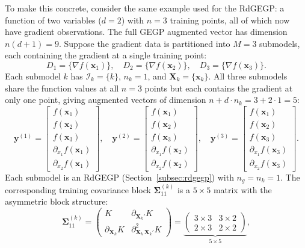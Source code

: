 \documentclass[12pt]{article}
\begin{document}
To make this concrete, consider the same example used for the RdGEGP: a function of two variables ($d = 2$) with $n = 3$ training points, all of which now have gradient observations. The full GEGP augmented vector has dimension $n(d+1) = 9$. Suppose the gradient data is partitioned into $M = 3$ submodels, each containing the gradient at a single training point:
\begin{equation}
	D_1 = \{\nabla f(\mathbf{x}_1)\}, \quad D_2 = \{\nabla f(\mathbf{x}_2)\}, \quad D_3 = \{\nabla f(\mathbf{x}_3)\}.
\end{equation}
Each submodel $k$ has $\mathcal{I}_k = \{k\}$, $n_k = 1$, and $\mathbf{X}_k = \{\mathbf{x}_k\}$. All three submodels share the function values at all $n = 3$ points but each contains the gradient at only one point, giving augmented vectors of dimension $n + d \cdot n_k = 3 + 2 \cdot 1 = 5$:
\begin{equation}
	\label{eqn:wgegp_aug_vectors_2d}
	\mathbf{y}^{(1)} = \begin{bmatrix} f(\mathbf{x}_1) \\ f(\mathbf{x}_2) \\ f(\mathbf{x}_3) \\ \partial_{x_1} f(\mathbf{x}_1) \\ \partial_{x_2} f(\mathbf{x}_1) \end{bmatrix}, \quad
	\mathbf{y}^{(2)} = \begin{bmatrix} f(\mathbf{x}_1) \\ f(\mathbf{x}_2) \\ f(\mathbf{x}_3) \\ \partial_{x_1} f(\mathbf{x}_2) \\ \partial_{x_2} f(\mathbf{x}_2) \end{bmatrix}, \quad
	\mathbf{y}^{(3)} = \begin{bmatrix} f(\mathbf{x}_1) \\ f(\mathbf{x}_2) \\ f(\mathbf{x}_3) \\ \partial_{x_1} f(\mathbf{x}_3) \\ \partial_{x_2} f(\mathbf{x}_3) \end{bmatrix}.
\end{equation}
Each submodel is an RdGEGP (Section~\ref{subsec:rdgegp}) with $n_g = n_k = 1$. The corresponding training covariance block $\boldsymbol{\Sigma}^{(k)}_{11}$ is a $5 \times 5$ matrix with the asymmetric block structure:
\begin{equation}
	\label{eqn:wgegp_S11_2d}
	\boldsymbol{\Sigma}^{(k)}_{11} =
	\begin{pmatrix}
		K & \partial_{\mathbf{X}_k'} K \\
		\partial_{\mathbf{X}_k} K & \partial^2_{\mathbf{X}_k\,\mathbf{X}_k'} K
	\end{pmatrix}
	=
	\underbrace{\begin{pmatrix}
		\text{$3 \times 3$} & \text{$3 \times 2$} \\
		\text{$2 \times 3$} & \text{$2 \times 2$}
	\end{pmatrix}}_{\text{$5 \times 5$}},
\end{equation}
\end{document}
